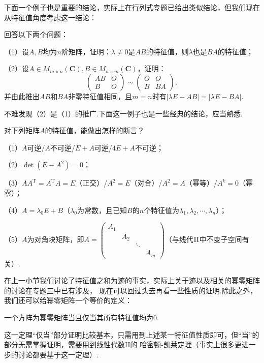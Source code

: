 下面一个例子也是重要的结论，实际上在行列式专题已给出类似结论，但我们现在从特征值角度考虑这一结论：
\begin{example}
	回答以下两个问题：
	
	\textup{（1）}设$A,B$均为$n$阶矩阵，证明：$\lambda\neq 0$是$AB$的特征值，则$\lambda$也是$BA$的特征值\textup{；}
	
	\textup{（2）}设$A\in M_{m\times n}(\mathbf{C}),B\in M_{n\times m}(\mathbf{C})$，证明：
	$$\begin{pmatrix}
		AB & O \\ B & O
	\end{pmatrix}\sim\begin{pmatrix}
		O & O \\ B & BA
	\end{pmatrix},$$
	并由此推出$AB$和$BA$非零特征值相同，且$m=n$时有$|\lambda E-AB|=|\lambda E-BA|$.
\end{example}
不难发现（2）是（1）的推广.下面这一例子也是一些经典的结论，应当熟悉.
\begin{example}
	对下列矩阵$A$的特征值，能做出怎样的断言？
	
	\textup{（1）}$A$可逆/$A$不可逆/$E+A$可逆/$4E+A$不可逆\textup{；}
	
	\textup{（2）}$\det(E-A^2)=0$\textup{；}
	
	\textup{（3）}$AA^\mathrm{T}=A^\mathrm{T}A=E$（正交）/$A^2=E$（对合）/$A^2=A$（幂等）/$A^k=0$（幂零）\textup{；}
	
	\textup{（4）}$A=\lambda_0E+B$（$\lambda_0$为常数，且已知$B$的$n$个特征值为$\lambda_1,\lambda_2,\cdots,\lambda_n$）\textup{；}
	
	\textup{（5）}$A$为对角块矩阵，即$A=\begin{pmatrix}
		A_1 &  &  &  \\  & A_2 &  &  \\  &  & \ddots &  \\  &  &  & A_m
	\end{pmatrix}$（与线代$\textup{II}$中不变子空间有关）.
\end{example}
在上一小节我们讨论了特征值之和为迹的事实，实际上关于迹以及相关的幂零矩阵的讨论在专题三中已有涉及，
现在可以回过头去再看一些性质的证明.除此之外，我们还可以给幂零矩阵一个等价的定义：
\begin{theorem}
	一个方阵为幂零矩阵当且仅当其所有特征值均为$0$.
\end{theorem}
这一定理“仅当”部分证明比较基本，只需用到上述某一特征值性质即可，但“当”的部分无需掌握证明，需要用到线性代数II的
哈密顿-凯莱定理（事实上很多更进一步的讨论都要基于这一定理）.
